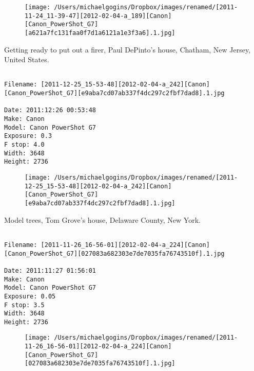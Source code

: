 \documentclass[11pt,letter,DIV=14,paper=landscape]{scrbook}
\begin{document}
\begin{figure}
\texttt{[image: /Users/michaelgogins/Dropbox/images/renamed/[2011-11-24\_11-39-47][2012-02-04-a\_189][Canon][Canon\_PowerShot\_G7][a621a7fc131faa0f7d1a6121a1e3f3a6].1.jpg]}
\end{figure}
    
\clearpage
\noindent Getting ready to put out a firer, Paul DePinto's house, Chatham, New Jersey, United States.
\noindent
\begin{lstlisting}

Filename: [2011-12-25_15-53-48][2012-02-04-a_242][Canon][Canon_PowerShot_G7][e9aba7cd07ab337f4dc297c2fbf7dad8].1.jpg

Date: 2011:12:26 00:53:48
Make: Canon
Model: Canon PowerShot G7
Exposure: 0.3
F stop: 4.0
Width: 3648
Height: 2736
\end{lstlisting}
\clearpage

\begin{figure}
\texttt{[image: /Users/michaelgogins/Dropbox/images/renamed/[2011-12-25\_15-53-48][2012-02-04-a\_242][Canon][Canon\_PowerShot\_G7][e9aba7cd07ab337f4dc297c2fbf7dad8].1.jpg]}
\end{figure}
    
\clearpage
\noindent Model trees, Tom Grove's house, Delaware County, New York.
\noindent
\begin{lstlisting}

Filename: [2011-11-26_16-56-01][2012-02-04-a_224][Canon][Canon_PowerShot_G7][027083a682303e7de7035fa76743510f].1.jpg

Date: 2011:11:27 01:56:01
Make: Canon
Model: Canon PowerShot G7
Exposure: 0.05
F stop: 3.5
Width: 3648
Height: 2736
\end{lstlisting}
\clearpage

\begin{figure}
\texttt{[image: /Users/michaelgogins/Dropbox/images/renamed/[2011-11-26\_16-56-01][2012-02-04-a\_224][Canon][Canon\_PowerShot\_G7][027083a682303e7de7035fa76743510f].1.jpg]}
\end{figure}
    
\end{document}
